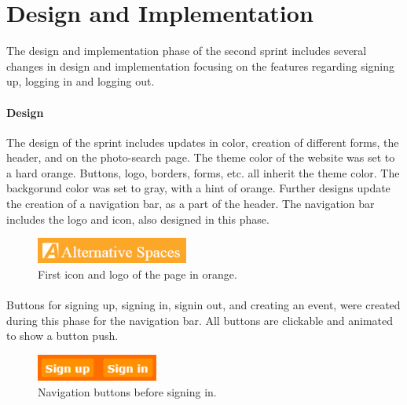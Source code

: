 \section{Design and Implementation} 
The design and implementation phase of the second sprint includes several changes in design and implementation focusing on the features regarding signing up, logging in and logging out. 

\paragraph{Design}
The design of the sprint includes updates in color, creation of different forms, the header, and on the photo-search page. The theme color of the website was set to a hard orange. Buttons, logo, borders, forms, etc. all inherit the theme color. The backgorund color was set to gray, with a hint of orange. Further designs update the creation of a navigation bar, as a part of the header. The navigation bar includes the logo and icon, also designed in this phase. \\

\begin{figure}[ht!]
\centering
\includegraphics[width=50mm]{Sprint2/img/Sprint2-logo1.png}
\caption{First icon and logo of the page in orange. \label{overflow}}
\end{figure}

\paragraph{} Buttons for signing up, signing in, signin out, and creating an event, were created during this phase for the navigation bar. All buttons are clickable and animated to show a button push. \\

\begin{figure}[ht!]
\centering
\includegraphics[width=40mm]{Sprint2/img/Sprint2-buttons1.png}
\caption{Navigation buttons before signing in. \label{overflow}}
\end{figure}

